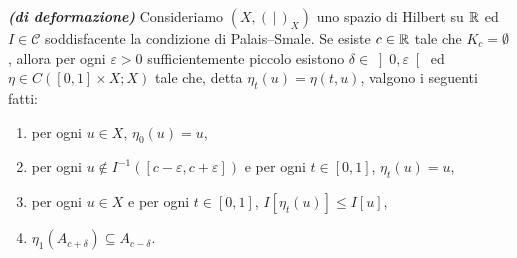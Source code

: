 \begin{teorema}\emph{\textbf{(di deformazione)}}
	Consideriamo $(X, (\,|\,)_X)$ uno spazio di Hilbert su $\mathbb{R}$ ed $I \in \mathcal{C}$ soddisfacente la condizione di Palais--Smale. Se esiste $c \in \mathbb{R}$ tale che $K_c = \emptyset$, allora per ogni $\varepsilon>0$ sufficientemente piccolo esistono $\delta \in \left] 0,\varepsilon\right[$ ed $\eta \in C([0,1]\times X; X)$ tale che, detta $\eta_t(u) = \eta(t,u)$, valgono i seguenti fatti:
	\begin{enumerate}[$(a)$]
		\item per ogni $u \in X$, $\eta_0(u) = u$,
		\item per ogni $u \notin I^{-1}(\left[ c-\varepsilon,c+\varepsilon\right] )$ e per ogni $t \in [0,1]$, $\eta_t(u) = u$,
		\item per ogni $u \in X$ e per ogni $t \in [0,1]$, $I[\eta_t(u)] \le I[u]$,
		\item $\eta_1(A_{c+\delta})\subseteq A_{c-\delta}$.
	\end{enumerate}
\end{teorema}
